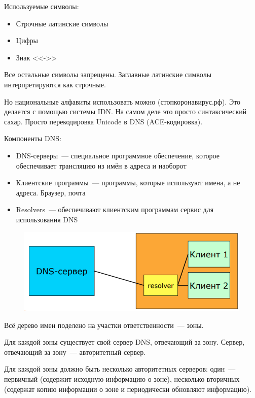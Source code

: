 
Используемые символы:
\begin{itemize}
    \item Строчные латинские символы
    \item Цифры
    \item Знак <<->>
\end{itemize}

Все остальные символы запрещены. Заглавные латинские символы интерпретируются как строчные.

Но национальные алфавиты использовать можно (стопкоронавирус.рф). Это делается с помощью системы IDN. На самом деле это просто синтаксический сахар. Просто перекодировка Unicode в DNS (ACE-кодировка).


Компоненты DNS:
\begin{itemize}
    \item DNS-серверы~--- специальное программное обеспечение, которое обеспечивает трансляцию из имён в адреса и наоборот
    \item Клиентские программы~--- программы, которые используют имена, а не адреса. Браузер, почта
    \item Resolvers~--- обеспечивают клиентским программам сервис для использования DNS
\end{itemize}

\begin{figure}[H]
  \centering
  \includegraphics[width=15cm]{images/05/02}
\end{figure}


Всё дерево имен поделено на участки ответственности~--- зоны.

Для каждой зоны существует свой сервер DNS, отвечающий за зону. Сервер, отвечающий за зону~--- авторитетный сервер.

Для каждой зоны должно быть несколько авторитетных серверов: один~--- первичный (содержит исходную информацию о зоне), несколько вторичных (содержат копию информации о зоне и периодически обновляют информацию).

